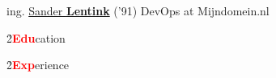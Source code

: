 \large ing.
\Huge \href{http://lent.ink}{Sander \textbf{Lentink}}
\large ('91) DevOps at Mijndomein.nl
\normalsize

\h{2}{\textbf{\textcolor{red}{Edu}}cation}{}


\h{2}{\textbf{\textcolor{red}{Exp}}erience}{}

